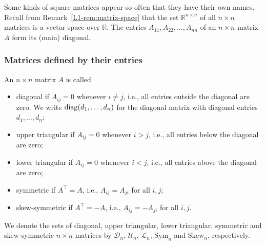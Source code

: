 Some kinds of square matrices appear so often that they have their own names. Recall from Remark~\ref{L1-rem:matrix-space} that the set $\mathbb{R}^{n \times n}$ of all $n \times n$ matrices is a vector space over $\mathbb{R}$. The entries $A_{11}, A_{22}, \ldots, A_{nn}$ of an $n \times n$ matrix $A$ form its (main) diagonal.

\subsubsection{Matrices defined by their entries}

\begin{definition}
    An $n \times n$ matrix $A$ is called
    \begin{itemize}
        \item diagonal if $A_{ij} = 0$ whenever $i \neq j$, i.e., all entries outside the diagonal are zero. We write $\operatorname{diag}(d_1, \ldots, d_n)$ for the diagonal matrix with diagonal entries $d_1, \ldots, d_n$;
        \item upper triangular if $A_{ij} = 0$ whenever $i > j$, i.e., all entries below the diagonal are zero;
        \item lower triangular if $A_{ij} = 0$ whenever $i < j$, i.e., all entries above the diagonal are zero;
        \item symmetric if $A^\top = A$, i.e., $A_{ij} = A_{ji}$ for all $i, j$;
        \item skew-symmetric if $A^\top = -A$, i.e., $A_{ij} = -A_{ji}$ for all $i, j$.
    \end{itemize}
    We denote the sets of diagonal, upper triangular, lower triangular, symmetric and skew-symmetric $n \times n$ matrices by $\mathcal{D}_n$, $\mathcal{U}_n$, $\mathcal{L}_n$, $\mathrm{Sym}_n$ and $\mathrm{Skew}_n$, respectively.
\end{definition}

